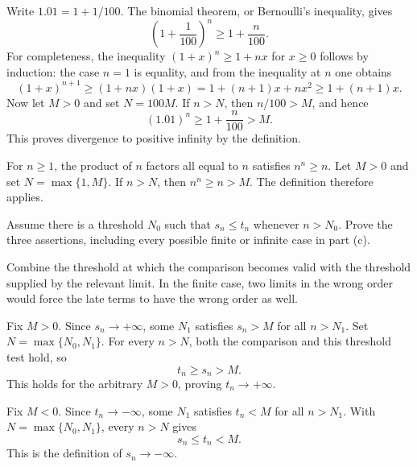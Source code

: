 
Write $1.01=1+1/100$. The binomial theorem, or Bernoulli's
inequality, gives
\[
 \left(1+\frac1{100}\right)^n\geq1+\frac n{100}.
\]
For completeness, the inequality $(1+x)^n\geq1+nx$ for
$x\geq0$ follows by induction: the case $n=1$ is equality,
and from the inequality at $n$ one obtains
\[
 (1+x)^{n+1}\geq(1+nx)(1+x)
 =1+(n+1)x+nx^2\geq1+(n+1)x.
\]
Now let $M>0$ and set $N=100M$. If $n>N$, then
$n/100>M$, and hence
\[
 (1.01)^n\geq1+\frac n{100}>M.
\]
This proves divergence to positive infinity by the definition.


For $n\geq1$, the product of $n$ factors all equal to $n$
satisfies $n^n\geq n$. Let $M>0$ and set
$N=\max\{1,M\}$. If $n>N$, then
$n^n\geq n>M$. The definition therefore applies.



\goal Assume there is a threshold $N_0$ such that
$s_n\leq t_n$ whenever $n>N_0$. Prove the three assertions,
including every possible finite or infinite case in part (c).

\idea Combine the threshold at which the comparison becomes
valid with the threshold supplied by the relevant limit. In the
finite case, two limits in the wrong order would force the late
terms to have the wrong order as well.

Fix $M>0$. Since $s_n\to+\infty$, some $N_1$ satisfies
$s_n>M$ for all $n>N_1$. Set $N=\max\{N_0,N_1\}$.
For every $n>N$, both the comparison and this threshold test
hold, so
\[
 t_n\geq s_n>M.
\]
This holds for the arbitrary $M>0$, proving $t_n\to+\infty$.

Fix $M<0$. Since $t_n\to-\infty$, some $N_1$ satisfies
$t_n<M$ for all $n>N_1$. With
$N=\max\{N_0,N_1\}$, every $n>N$ gives
\[
 s_n\leq t_n<M.
\]
This is the definition of $s_n\to-\infty$.

